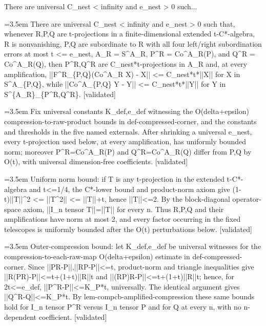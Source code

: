 \documentclass{article}
\newcommand{\step}[1]{\par\noindent\hangindent=3.5em\hangafter=1%
  \makebox[3.5em][l]{\textbf{#1.}}}
\newcommand{\steptag}[1]{\hfill{\small\textsf{[#1]}}}
\begin{document}
\begin{proofbox}{There are universal C\_nest < infinity and e\_nest > 0 such...}
\step{1} There are universal C\_nest < infinity and e\_nest > 0 such that, whenever R,P,Q are t-projections in a finite-dimensional extended t-C*-algebra, R is nonvanishing, P,Q are subordinate to R with all four left/right subordination errors at most t <= e\_nest, A\_R = S\textasciicircum{}A\_R, P\textasciicircum{}R = Co\textasciicircum{}A\_R(P), and Q\textasciicircum{}R = Co\textasciicircum{}A\_R(Q), then P\textasciicircum{}R,Q\textasciicircum{}R are C\_nest*t-projections in A\_R and, at every amplification, ||F\textasciicircum{}R\_\{P,Q\}(Co\textasciicircum{}A\_R X) - X|| <= C\_nest*t*||X|| for X in S\textasciicircum{}A\_\{P,Q\}, while ||Co\textasciicircum{}A\_\{P,Q\} Y - Y|| <= C\_nest*t*||Y|| for Y in S\textasciicircum{}\{A\_R\}\_\{P\textasciicircum{}R,Q\textasciicircum{}R\}. \steptag{validated} \\[6pt]
\step{1.1} Fix universal constants K\_def,e\_def witnessing the O(delta+epsilon) compression-to-raw-product bounds in def-compressed-corner, and the constants and thresholds in the five named externals. After shrinking a universal e\_nest, every t-projection used below, at every amplification, has uniformly bounded norm; moreover P\textasciicircum{}R=Co\textasciicircum{}A\_R(P) and Q\textasciicircum{}R=Co\textasciicircum{}A\_R(Q) differ from P,Q by O(t), with universal dimension-free coefficients. \steptag{validated} \\[6pt]
\step{1.1.1} Uniform norm bound: if T is any t-projection in the extended t-C*-algebra and t<=1/4, the C*-lower bound and product-norm axiom give (1-t)||T||\textasciicircum{}2 <= ||T\textasciicircum{}2|| <= ||T||+t, hence ||T||<=2. By the block-diagonal operator-space axiom, ||I\_n tensor T||=||T|| for every n. Thus R,P,Q and their amplifications have norm at most 2, and every factor occurring in the fixed telescopes is uniformly bounded after the O(t) perturbations below. \steptag{validated} \\[4pt]
\step{1.1.2} Outer-compression bound: let K\_def,e\_def be universal witnesses for the compression-to-each-raw-map O(delta+epsilon) estimate in def-compressed-corner. Since ||PR-P||,||RP-P||<=t, product-norm and triangle inequalities give ||R(PR)-P||<=t+(1+t)||R||t and ||(RP)R-P||<=t+(1+t)||R||t; hence, for 2t<=e\_def, ||P\textasciicircum{}R-P||<=K\_P*t, universally. The identical argument gives ||Q\textasciicircum{}R-Q||<=K\_P*t. By lem-compcb-amplified-compression these same bounds hold for I\_n tensor P\textasciicircum{}R versus I\_n tensor P and for Q at every n, with no n-dependent coefficient. \steptag{validated} \\[4pt]

\end{proofbox}
\end{document}
